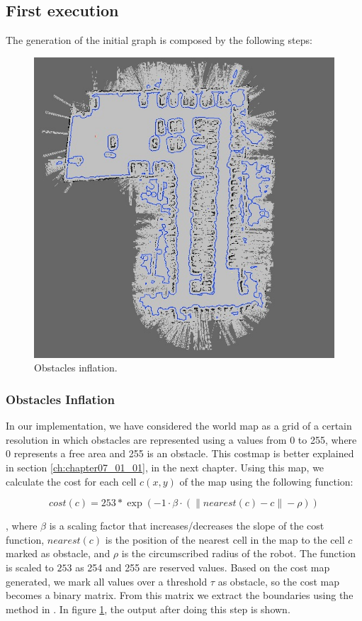 \subsection{First execution}\label{ch:chapter06_01_01}

The generation of the initial graph is composed by the following steps:

\begin{figure}[h!]
  \centering
  \includegraphics[width=\textwidth, height=0.75\textwidth]{figure1}
  \caption{Obstacles inflation.}
  \label{fig:cp06_obst_inflation}
\end{figure}    

\subsubsection{Obstacles Inflation}\label{ch:chapter06_01_01_01}

In our implementation, we have considered the world map as a grid of a certain resolution in which obstacles are represented using a values from 0 to 255, where 0 represents a free area and 255 is an obstacle. This costmap is better explained in section \ref{ch:chapter07_01_01}, in the next chapter. Using this map, we calculate the cost for each cell $c(x,y)$ of the map using the following function:

\begin{equation}\label{eq:cp06_cell_cost}
 cost(c) = 253 * \exp( -1 \cdot \beta \cdot (\| nearest(c) - c\| - \rho) )
\end{equation}

, where $\beta$ is a scaling factor that increases/decreases the slope of the cost function, $nearest(c)$ is the position of the nearest cell in the map to the cell $c$ marked as obstacle, and $\rho$ is the circumscribed radius of the robot. The function is scaled to $253$ as 254 and 255 are reserved values. Based on the cost map generated, we mark all values over a threshold $\tau$ as obstacle, so the cost map becomes a binary matrix. From this matrix we extract the boundaries using the method in \cite{suzuki1985topological}. In figure \ref{fig:cp06_obst_inflation}, the output after doing this step is shown.



